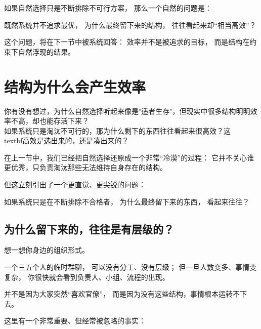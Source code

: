 \documentclass[../main.tex]{subfiles}
\begin{document}

\begin{readingnote}
	如果自然选择只是不断排除不可行方案，
	那么一个自然的问题是：
	
	既然系统并不追求最优，
	为什么最终留下来的结构，
	往往看起来却“相当高效”？
\end{readingnote}

这个问题，将在下一节中被系统回答：
效率并不是被追求的目标，
而是结构在约束下自然浮现的结果。


\section{结构为什么会产生效率}

\begin{readingnote}
	你有没有想过，为什么自然选择听起来像是"适者生存"，但现实中很多结构明明效率不高，却也能存活下来？\\
	如果系统只是淘汰不可行的，那为什么剩下的东西往往看起来很高效？这\\textbf{高效是选出来的，还是凑出来的}？
\end{readingnote}

\begin{motivation}
	在上一节中，我们已经把自然选择还原成一个非常“冷漠”的过程：
	它并不关心谁更优秀，只负责淘汰那些无法维持自身存在的结构。
	
	但这立刻引出了一个更直觉、更尖锐的问题：
	
	如果系统只是在不断排除不合格者，
	为什么最终留下来的东西，
	看起来往往？
\end{motivation}

\subsection{为什么留下来的，往往是有层级的？}

\begin{readingnote}
	想一想你身边的组织形式。
	
	一个三五个人的临时群聊，
	可以没有分工、没有层级；
	但一旦人数变多、事情变复杂，
	你很快就会看到负责人、小组、流程的出现。
	
	并不是因为大家突然“喜欢官僚”，
	而是因为没有这些结构，事情根本运转不下去。
\end{readingnote}

这里有一个非常重要、但经常被忽略的事实：

\end{document}

